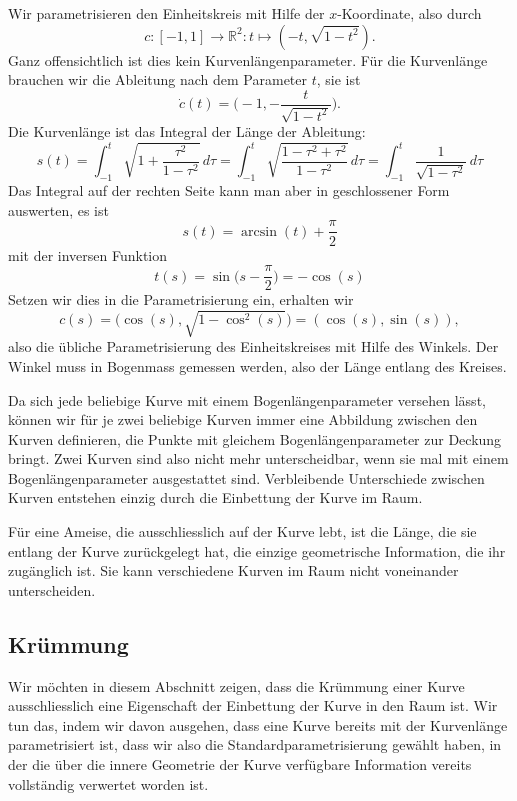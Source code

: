 \begin{beispiel}
Wir parametrisieren den Einheitskreis mit Hilfe der $x$-Koordinate, also
durch
\[
c\colon
[-1,1]\to\mathbb R^2
\colon
t\mapsto (-t,\sqrt{1-t^2}).
\]
Ganz offensichtlich ist dies kein Kurvenlängenparameter.
Für die Kurvenlänge brauchen wir die Ableitung nach dem Parameter $t$,
sie ist
\[
\dot c(t)=\biggl(-1, -\frac{t}{\sqrt{1-t^2}}\biggr).
\]
Die Kurvenlänge ist das Integral der Länge der Ableitung:
\[
s(t)
=
\int_{-1}^t \sqrt{1 + \frac{\tau^2}{1-\tau^2}}\,d\tau
=
\int_{-1}^t \sqrt{\frac{1-\tau^2 +\tau^2}{1-\tau^2}}\,d\tau
=
\int_{-1}^t \frac{1}{\sqrt{1-\tau^2}}\,d\tau
\]
Das Integral auf der rechten Seite kann man aber in geschlossener
Form auswerten, es ist
\[
s(t)=\arcsin(t) + \frac{\pi}{2}
\]
mit der inversen Funktion
\[
t(s)
=
\sin\biggl(s-\frac{\pi}2\biggr)
=
-\cos(s)
\]
Setzen wir dies in die Parametrisierung ein, erhalten wir
\[
c(s)
=
\bigl(\cos(s), \sqrt{1-\cos^2(s)}\bigr)
=
(\cos(s), \sin(s)),
\]
also die übliche Parametrisierung des Einheitskreises mit Hilfe
des Winkels.
Der Winkel muss in Bogenmass gemessen werden, also der Länge entlang
des Kreises.
\end{beispiel}

Da sich jede beliebige Kurve mit einem Bogenlängenparameter versehen
lässt, können wir für je zwei beliebige Kurven immer eine Abbildung
zwischen den Kurven definieren, die Punkte mit gleichem Bogenlängenparameter
zur Deckung bringt.
Zwei Kurven sind also nicht mehr unterscheidbar, wenn sie mal mit
einem Bogenlängenparameter ausgestattet sind.
Verbleibende Unterschiede zwischen Kurven entstehen einzig durch die
Einbettung der Kurve im Raum.

Für eine Ameise, die ausschliesslich auf der Kurve lebt, ist die Länge,
die sie entlang der Kurve zurückgelegt hat, die einzige geometrische
Information, die ihr zugänglich ist.
Sie kann verschiedene Kurven im Raum nicht voneinander unterscheiden.

\subsection{Krümmung}
Wir möchten in diesem Abschnitt zeigen, dass die Krümmung einer Kurve
ausschliesslich eine Eigenschaft der Einbettung der Kurve in den
Raum ist.
Wir tun das, indem wir davon ausgehen, dass eine Kurve bereits mit
der Kurvenlänge parametrisiert ist, dass wir also die Standardparametrisierung
gewählt haben, in der die über die innere Geometrie der Kurve verfügbare
Information vereits vollständig verwertet worden ist.

